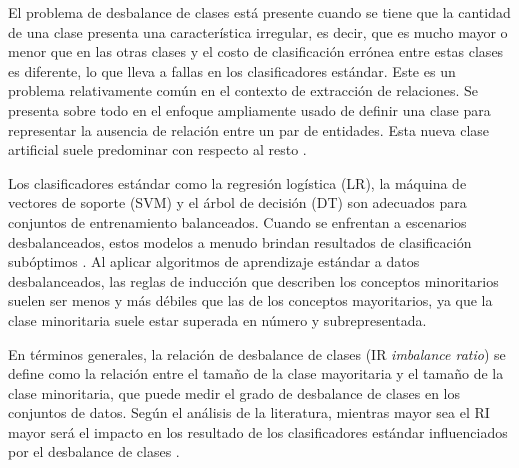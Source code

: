 
El problema de desbalance de clases está presente cuando se tiene que la cantidad de una clase presenta una característica irregular, es decir, que es mucho mayor o menor que en las otras clases y el costo de clasificación errónea entre estas clases es diferente, lo que lleva a fallas en los clasificadores estándar. Este es un problema relativamente común en el contexto de extracción de relaciones. Se presenta sobre todo en el enfoque ampliamente usado de definir una clase para representar la ausencia de relación entre un par de entidades. Esta nueva clase artificial suele predominar con respecto al resto \cite{nguyen2015relation}.  

Los clasificadores estándar como la regresión logística (LR), la máquina de vectores de soporte (SVM) y el árbol de decisión (DT) son adecuados para conjuntos de entrenamiento balanceados. Cuando se enfrentan a escenarios desbalanceados, estos modelos a menudo brindan resultados de clasificación subóptimos \cite{huang2021LearningFC}. Al aplicar algoritmos de aprendizaje estándar a datos desbalanceados, las reglas de inducción que describen los conceptos minoritarios suelen ser menos y más débiles que las de los conceptos mayoritarios, ya que la clase minoritaria suele estar superada en número y subrepresentada.

En términos generales, la relación de desbalance de clases (IR \textit{imbalance ratio}) se define como la relación entre el tamaño de la clase mayoritaria y el tamaño de la clase minoritaria, que puede medir el grado de desbalance de clases en los conjuntos de datos. Según el análisis de la literatura, mientras mayor sea el RI mayor será el impacto en los resultado de los clasificadores estándar influenciados por el desbalance de clases \cite{vong2020accurate}.

%
%

